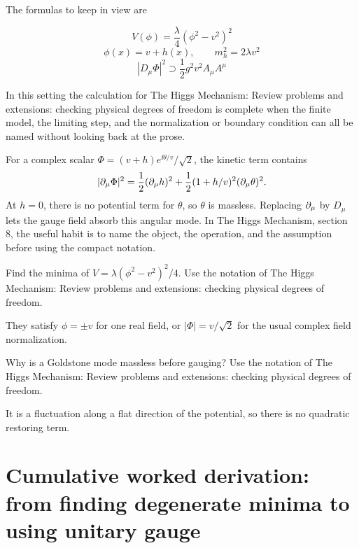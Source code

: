 The formulas to keep in view are

\[
  V(\phi)=\frac{\lambda}{4}(\phi^2-v^2)^2
\]
\[
  \phi(x)=v+h(x),\qquad m_h^2=2\lambda v^2
\]
\[
  |D_\mu\Phi|^2\supset \frac12g^2v^2A_\mu A^\mu
\]

In this setting the calculation for The Higgs Mechanism: Review problems and extensions: checking physical degrees of freedom is complete when the finite model, the limiting step, and the normalization or boundary condition can all be named without looking back at the prose.




\begin{example}
For a complex scalar \(\Phi=(v+h)e^{\ii\theta/v}/\sqrt2\), the kinetic term contains
\[
  |\partial_\mu\Phi|^2=\frac12(\partial_\mu h)^2+\frac12(1+h/v)^2(\partial_\mu\theta)^2.
\]
At \(h=0\), there is no potential term for \(\theta\), so \(\theta\) is massless.  Replacing \(\partial_\mu\) by \(D_\mu\) lets the gauge field absorb this angular mode.  In The Higgs Mechanism, section 8, the useful habit is to name the object, the operation, and the assumption before using the compact notation.
\end{example}



\begin{exercise}
Find the minima of \(V=\lambda(\phi^2-v^2)^2/4\).  Use the notation of The Higgs Mechanism: Review problems and extensions: checking physical degrees of freedom.
\begin{answer}
They satisfy \(\phi=\pm v\) for one real field, or \(|\Phi|=v/\sqrt2\) for the usual complex field normalization.
\end{answer}
\end{exercise}

\begin{exercise}
Why is a Goldstone mode massless before gauging?  Use the notation of The Higgs Mechanism: Review problems and extensions: checking physical degrees of freedom.
\begin{answer}
It is a fluctuation along a flat direction of the potential, so there is no quadratic restoring term.
\end{answer}
\end{exercise}



\section{Cumulative worked derivation: from finding degenerate minima to using unitary gauge}

